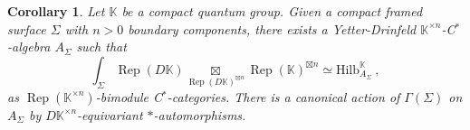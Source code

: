\documentclass[a4paper,11pt,reqno]{amsart}
\numberwithin{equation}{section}
\newtheorem{corollary}[theorem]{Corollary}
\theoremstyle{remark}
\theoremstyle{definition}
\newcommand{\bK}{\mathbb K}
\DeclareMathOperator{\Rep}{Rep}
\newcommand{\Hilb}{\mathrm{Hilb}}
\begin{document}
\begin{corollary}
	Let $\bK$ be a compact quantum group. Given a compact framed surface $\Sigma$ with $n >0$ boundary components, there exists a Yetter-Drinfeld $\bK^{\times n}$-C$^*$-algebra $A_\Sigma$ such that
	\[
	\int_\Sigma \Rep(D\bK) \underset{\Rep(D\bK)^{\boxtimes n}}{\boxtimes} \Rep(\bK)^{\boxtimes n} \simeq \Hilb_{A_\Sigma}^{\bK} \ ,
	\]
	as $\Rep(\bK^{\times n})$-bimodule C$^*$-categories. There is a canonical action of $\Gamma(\Sigma)$ on $A_\Sigma$ by $D\bK^{\times n}$-equivariant $*$-automorphisms.
	\label{cor:DrinfelddoubleactionsfromFH}
\end{corollary}








\end{document}
